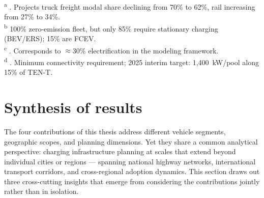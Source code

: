\begin{table}[H]
\begin{tabularx}{\textwidth}{@{}p{3.2cm}cp{2.8cm}X@{}}
\bottomrule
\end{tabularx}

\vspace{0.3cm}
\begin{minipage}{\textwidth}
\footnotesize
\textsuperscript{a} \citet{umweltbundesamt_rep0808}. Projects truck freight modal share declining from 70\% to 62\%, rail increasing from 27\% to 34\%. \\
\textsuperscript{b} 100\% zero-emission fleet, but only 85\% require stationary charging (\ac{BEV}/ERS); 15\% are FCEV. \\
\textsuperscript{c} \cite{ioebenergiespeicher}. Corresponds to $\approx$30\% electrification in the modeling framework. \\
\textsuperscript{d} \cite{EU2023AFIR}. Minimum connectivity requirement; 2025 interim target: 1,400~kW/pool along 15\% of TEN-T.
\end{minipage}

\end{table}
\newpage
\section{Synthesis of results} \label{sec:synthesis}

The four contributions of this thesis address different vehicle segments, geographic scopes, and planning dimensions. Yet they share a common analytical perspective: charging infrastructure planning at scales that extend beyond individual cities or regions — spanning national highway networks, international transport corridors, and cross-regional adoption dynamics. This section draws out three cross-cutting insights that emerge from considering the contributions jointly rather than in isolation.

